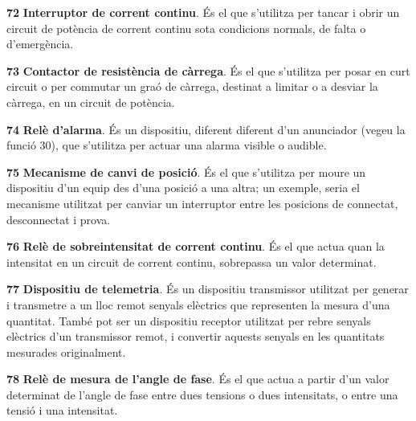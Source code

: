 \begin{multicols}{2}
\begin{list}{}
\item[\textbf{72}]   
\textbf{Interruptor de corrent
continu}. \'{E}s el que s'utilitza per tancar i obrir un circuit de pot\`{e}ncia de corrent continu
 sota condicions normals, de falta o d'emerg\`{e}ncia.

\item[\textbf{73}]   
\textbf{Contactor de resist\`{e}ncia
 de c\`{a}rrega}. \'{E}s el que s'utilitza per posar en curt circuit o per commutar un gra\'{o} de c\`{a}rrega,
 destinat a limitar o a desviar la c\`{a}rrega, en un circuit de pot\`{e}ncia.

\item[\textbf{74}]  
 \textbf{Rel\`{e} d'alarma}. \'{E}s un dispositiu,
diferent diferent d'un anunciador (vegeu la funci\'{o} 30), que s'utilitza per actuar una alarma
visible o audible.

\item[\textbf{75}]  
 \textbf{Mecanisme de canvi
de posici\'{o}}. \'{E}s el que s'utilitza per moure un dispositiu d'un equip
des d'una posici\'{o} a una altra; un  exemple, seria el mecanisme
utilitzat per canviar un interruptor entre les posicions de
connectat, desconnectat i prova.

\item[\textbf{76}]   
\textbf{Rel\`{e} de
sobreintensitat de corrent continu}. \'{E}s el que actua quan la intensitat en un circuit de
corrent continu, sobrepassa un valor determinat.

\item[\textbf{77}]   
\textbf{Dispositiu de telemetria}. \'{E}s un
 dispositiu transmissor utilitzat per generar i transmetre  a un lloc remot senyals el\`{e}ctrics que representen la mesura d'una quantitat. Tamb\'{e} pot ser un dispositiu receptor utilitzat per rebre senyals el\`{e}ctrics d'un transmissor remot, i convertir aquests senyals en les quantitats mesurades originalment.

\item[\textbf{78}]   
\textbf{Rel\`{e} de  mesura de l'angle de fase}. \'{E}s el que actua a partir d'un valor determinat de
l'angle de fase entre dues tensions o dues intensitats, o entre una
tensi\'{o} i una intensitat.


\end{list}
\end{multicols}

